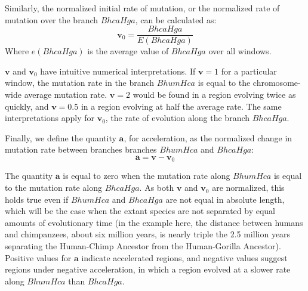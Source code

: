\documentclass{article} %
\begin{document}
Similarly, the normalized initial rate of mutation, or the normalized rate of mutation over the branch $BhcaHga$, can be calculated as:
\begin{equation*}
	\textbf{v}_0 = \frac{BhcaHga}{E(BhcaHga)}
\end{equation*}
Where $e(BhcaHga)$ is the average value of $BhcaHga$ over all windows.\par
$\textbf{v}$ and $\textbf{v}_0$ have intuitive numerical interpretations. If $\textbf{v} = 1$ for a particular window, the mutation rate in the branch $BhumHca$ is equal to the chromosome-wide average mutation rate. $\textbf{v} = 2$ would be found in a region evolving twice as quickly, and $\textbf{v} = 0.5$ in a region evolving at half the average rate. The same interpretations apply for $\textbf{v}_0$, the rate of evolution along the branch $BhcaHga$.\par
Finally, we define the quantity $\textbf{a}$, for acceleration, as the normalized change in mutation rate between branches branches $BhumHca$ and $BhcaHga$:
\begin{equation*}
\textbf{a} = \textbf{v} - \textbf{v}_0
\end{equation*}

The quantity $\textbf{a}$ is equal to zero when the mutation rate along $BhumHca$ is equal to the mutation rate along $BhcaHga$. As both $\textbf{v}$ and $\textbf{v}_0$ are normalized, this holds true even if $BhumHca$ and $BhcaHga$ are not equal in absolute length, which will be the case when the extant species are not separated by equal amounts of evolutionary time (in the example here, the distance between humans and chimpanzees, about six million years, is nearly triple the 2.5 million years separating the Human-Chimp Ancestor from the Human-Gorilla Ancestor). Positive values for $\textbf{a}$ indicate accelerated regions, and negative values suggest regions under negative acceleration, in which a region evolved at a slower rate along $BhumHca$ than $BhcaHga$.



 
\end{document}
